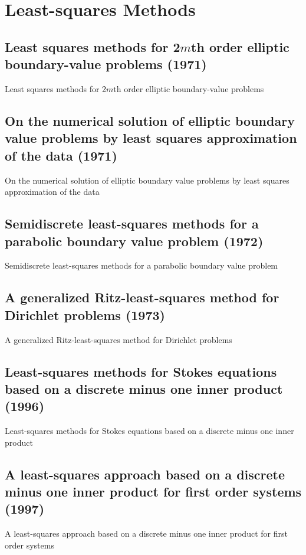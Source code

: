 \chapter{Least-squares Methods}

\section{Least squares methods for 2$m$th order elliptic boundary-value problems (1971)}
Least squares methods for 2$m$th order elliptic boundary-value problems \cite{bramble1971least}



\section{On the numerical solution of elliptic boundary value problems by least squares approximation of the data (1971)}
On the numerical solution of elliptic boundary value problems by least squares approximation of the data \cite{bramble1971numerical}



\section{Semidiscrete least-squares methods for a parabolic boundary value problem (1972)}
Semidiscrete least-squares methods for a parabolic boundary value problem \cite{bramble1972semidiscrete}



\section{A generalized Ritz-least-squares method for Dirichlet problems (1973)}
A generalized Ritz-least-squares method for Dirichlet problems \cite{bramble1973generalized}



\section{Least-squares methods for Stokes equations based on a discrete minus one inner product (1996)}
Least-squares methods for Stokes equations based on a discrete minus one inner product \cite{bramble1996least}



\section{A least-squares approach based on a discrete minus one inner product for first order systems (1997)}
A least-squares approach based on a discrete minus one inner product for first order systems \cite{bramble1997least}



